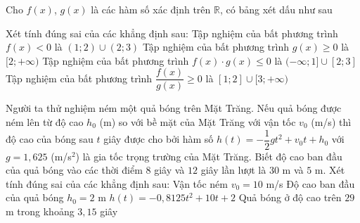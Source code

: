 \begin{ex}%
	Cho $f(x)$, $g(x)$ là các hàm số xác định trên $\mathbb{R}$, có bảng xét dấu như sau
	\begin{center}
	\end{center}
	Xét tính đúng sai của các khẳng định sau:
	\choiceTF
	{Tập nghiệm của bất phương trình $f(x)< 0$ là $(1;2)\cup (2;3)$}
	{\True Tập nghiệm của bất phương trình $g(x) \geq 0$ là $[2;+\infty)$}
	{\True Tập nghiệm của bất phương trình $f(x) \cdot g(x) \le 0$ là $(-\infty;1]\cup [2;3]$}
	{Tập nghiệm của bất phương trình $\dfrac{f(x)}{g(x)}\geq 0$ là $[1;2]\cup [3;+\infty)$}
	\loigiai
	{
	}
\end{ex}

\begin{ex}%
	Người ta thử nghiệm ném một quả bóng trên Mặt Trăng. Nếu quả bóng được ném lên từ độ cao $h_0$ (m) so với bề mặt của Mặt Trăng với vận tốc $v_0$ (m/s) thì độ cao của bóng sau $t$ giây được cho bởi hàm số $h(t)=-\dfrac{1}{2}gt^2+v_0t+h_0$ với $g=1{,}625$ (m/s$^2$) là gia tốc trọng trường của Mặt Trăng. Biết độ cao ban đầu của quả bóng vào các thời điểm $8$ giây và $12$ giây lần lượt là $30$ m và $5$ m. Xét tính đúng sai của các khẳng định sau:
	\choiceTF
	{Vận tốc ném $v_0=10$ m/s}
	{Độ cao ban đầu của quả bóng $h_0=2$ m}
	{$h(t)=-0,8125t^2+10t+2$}
	{Quả bóng ở độ cao trên $29$ m trong khoảng $3,15$ giây}
\end{ex}

